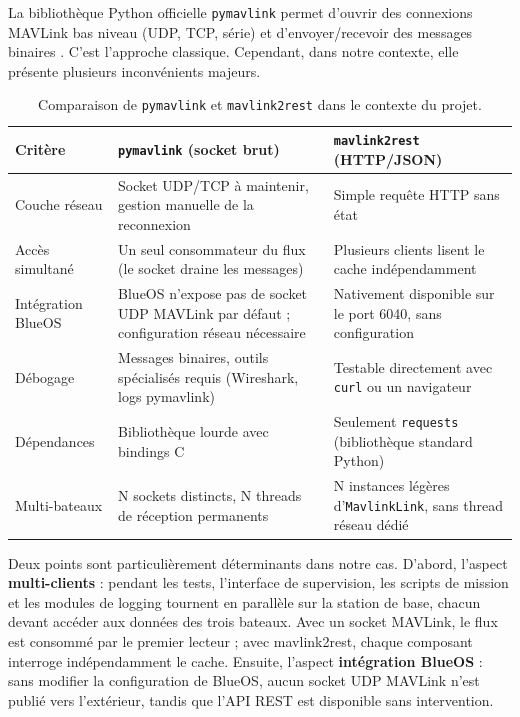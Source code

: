 La bibliothèque Python officielle \texttt{pymavlink} permet d'ouvrir des connexions MAVLink bas niveau (UDP, TCP, série) et d'envoyer/recevoir des messages binaires \cite{pymavlink_docs}. C'est l'approche classique. Cependant, dans notre contexte, elle présente plusieurs inconvénients majeurs.

\begin{table}[h]
  \centering
  \caption{Comparaison de \texttt{pymavlink} et \texttt{mavlink2rest} dans le contexte du projet.}
  \label{tab:mavlink_vs_rest}
  \renewcommand{\arraystretch}{1.3}
  \begin{tabular}{p{} p{} p{}}
    \toprule
    \textbf{Critère} & \textbf{\texttt{pymavlink} (socket brut)} & \textbf{\texttt{mavlink2rest} (HTTP/JSON)} \\
    \midrule
    Couche réseau
      & Socket UDP/TCP à maintenir, gestion manuelle de la reconnexion
      & Simple requête HTTP sans état \\
    Accès simultané
      & Un seul consommateur du flux (le socket draine les messages)
      & Plusieurs clients lisent le cache indépendamment \\
    Intégration BlueOS
      & BlueOS n'expose pas de socket UDP MAVLink par défaut ; configuration réseau nécessaire
      & Nativement disponible sur le port 6040, sans configuration \\
    Débogage
      & Messages binaires, outils spécialisés requis (Wireshark, logs pymavlink)
      & Testable directement avec \texttt{curl} ou un navigateur \\
    Dépendances
      & Bibliothèque lourde avec bindings C
      & Seulement \texttt{requests} (bibliothèque standard Python) \\
    Multi-bateaux
      & N sockets distincts, N threads de réception permanents
      & N instances légères d'\texttt{MavlinkLink}, sans thread réseau dédié \\
    \bottomrule
  \end{tabular}
\end{table}

Deux points sont particulièrement déterminants dans notre cas. D'abord, l'aspect \textbf{multi-clients} : pendant les tests, l'interface de supervision, les scripts de mission et les modules de logging tournent en parallèle sur la station de base, chacun devant accéder aux données des trois bateaux. Avec un socket MAVLink, le flux est consommé par le premier lecteur ; avec mavlink2rest, chaque composant interroge indépendamment le cache. Ensuite, l'aspect \textbf{intégration BlueOS} : sans modifier la configuration de BlueOS, aucun socket UDP MAVLink n'est publié vers l'extérieur, tandis que l'API REST est disponible sans intervention.

